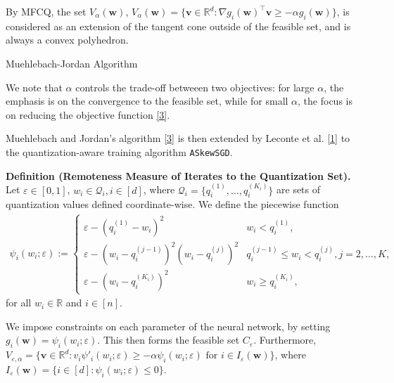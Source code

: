 \documentclass[10pt,a4paper]{article}
\begin{document}
By MFCQ, the set $V_\alpha(\mathbf{w})$, $V_\alpha(\mathbf{w})=\{\mathbf{v}\in\mathbb{R}^d: \nabla g_i(\mathbf{w})^\top \mathbf{v}\geq -\alpha g_i(\mathbf{w})\}$, is considered as an extension of the tangent cone outside of the feasible set, and is always a convex polyhedron.

\begin{algorithm}[H]
  \caption{Muehlebach-Jordan Algorithm}
\end{algorithm}


We note that $\alpha$ controls the trade-off betweeen two objectives: for large $\alpha$, the emphasis is on the convergence to the feasible set,
while for small $\alpha$, the focus is on reducing the objective function \ref{3}.

Muehlebach and Jordan's algorithm \ref{3} is then extended by Leconte et al. \ref{1} to the quantization-aware training algorithm \texttt{ASkewSGD}.

\textbf{Definition (Remoteness Measure of Iterates to the Quantization Set).} Let $\varepsilon\in[0,1]$, $w_i\in \mathcal{Q}_i, i\in [d]$,
where $\mathcal{Q}_i=\{q^{(1)}_i, \ldots, q^{(K_i)}_i\}$ are sets of quantization values defined coordinate-wise. We define the piecewise function
\begin{align*}\psi_{i}(w_i;\varepsilon):=\begin{cases}\varepsilon-(q_i^{(1)}-w_i)^2                    & w_i < q_i^{(1)},                                \\
             \varepsilon-(w_i-q_i^{(j-1)})^2(w_i-q_i^{(j)})^2 & q_i^{(j-1)}\leq w_i < q_i^{(j)}, j=2,\ldots, K, \\
             \varepsilon-(w_i-q_i^{(K_i)})^2                  & w_i \geq q_i^{(K_i)},\end{cases}
\end{align*} for all $w_i\in\mathbb{R}$ and $i\in [n]$.

We impose constraints on each parameter of the neural network, by setting $g_i(\mathbf{w})=\psi_i(w_i;\varepsilon)$. This then forms the feasible
set $C_\varepsilon$. Furthermore, $V_{\varepsilon, \alpha}=\{\mathbf{v}\in\mathbb{R}^d: v_i \psi'_i (w_i;\varepsilon)\geq -\alpha \psi_i(w_i;\varepsilon) \text{ for } i\in I_\varepsilon(\mathbf{w})\}$, where $I_\varepsilon(\mathbf{w})=\{i\in[d]: \psi_i(w_i;\varepsilon)\leq 0\}$.
\end{document}
